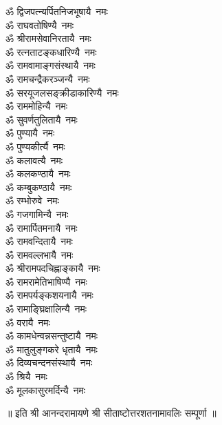 \begin{multicols}{2}
\begin{flushleft}
ॐ द्विजपत्न्यर्पितनिजभूषायै~नमः\\
ॐ राघवतोषिण्यै~नमः\\
ॐ श्रीरामसेवानिरतायै~नमः\\
ॐ रत्नताटङ्कधारिण्यै~नमः\\
ॐ रामवामाङ्गसंस्थायै~नमः\\
ॐ रामचन्द्रैकरञ्जन्यै~नमः\\
ॐ सरयूजलसङ्क्रीडाकारिण्यै~नमः\\
ॐ राममोहिन्यै~नमः\hfill{}\\
ॐ सुवर्णतुलितायै~नमः\\
ॐ पुण्यायै~नमः\\
ॐ पुण्यकीर्त्यै~नमः\\
ॐ कलावत्यै~नमः\\
ॐ कलकण्ठायै~नमः\\
ॐ कम्बुकण्ठायै~नमः\\
ॐ रम्भोरुवे~नमः\\
ॐ गजगामिन्यै~नमः\\
ॐ रामार्पितमनायै~नमः\\
ॐ रामवन्दितायै~नमः\hfill{}\\
ॐ रामवल्लभायै~नमः\\
ॐ श्रीरामपदचिह्नाङ्कायै~नमः\\
ॐ रामरामेतिभाषिण्यै~नमः\\
ॐ रामपर्यङ्कशयनायै~नमः\\
ॐ रामाङ्घ्रिक्षालिन्यै~नमः\\
ॐ वरायै~नमः\\
ॐ कामधेन्वन्नसन्तुष्टायै~नमः\\
ॐ मातुलुङ्गकरे धृतायै~नमः\\
ॐ दिव्यचन्दनसंस्थायै~नमः\\
ॐ श्रियै~नमः\hfill{}\\
ॐ मूलकासुरमर्दिन्यै~नमः\\
\end{flushleft}
\end{multicols}
\centerline{॥ इति श्री आनन्दरामायणे श्री सीताष्टोत्तरशतनामावलिः सम्पूर्णा ॥}
